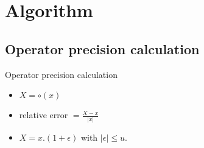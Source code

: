 \section{Algorithm}
\subsection{Operator precision calculation}
\begin{frame}{Operator precision calculation}


 \begin{itemize}
    \item <1-> $X = \circ(x)$
     \item <2-> relative error  $= \frac{X - x}{\lvert x \rvert}$
    \item <3-> $X =  x . (1 + \epsilon)$ with $\lvert \epsilon \rvert \le u$.
 \end{itemize} 
 \end{frame}
 

